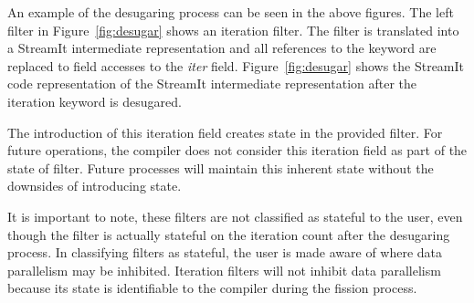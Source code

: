 An example of the desugaring process can be seen in the above figures.  The left filter in Figure~\ref{fig:desugar} shows an iteration filter.  The filter is translated into a StreamIt intermediate representation and all references to the keyword are replaced to field accesses to the {\it iter} field. Figure~\ref{fig:desugar} shows the StreamIt code representation of the StreamIt intermediate representation after the iteration keyword is desugared.

The introduction of this iteration field creates state in the provided filter.  For future operations, the compiler does not consider this iteration field as part of the state of filter.  Future processes will maintain this inherent state without the downsides of introducing state.

It is important to note, these filters are not classified as stateful to the user, even though the filter is actually stateful on the iteration count after the desugaring process.  In classifying filters as stateful, the user is made aware of where data parallelism may be inhibited.  Iteration filters will not inhibit data parallelism because its state is identifiable to the compiler during the fission process.   
